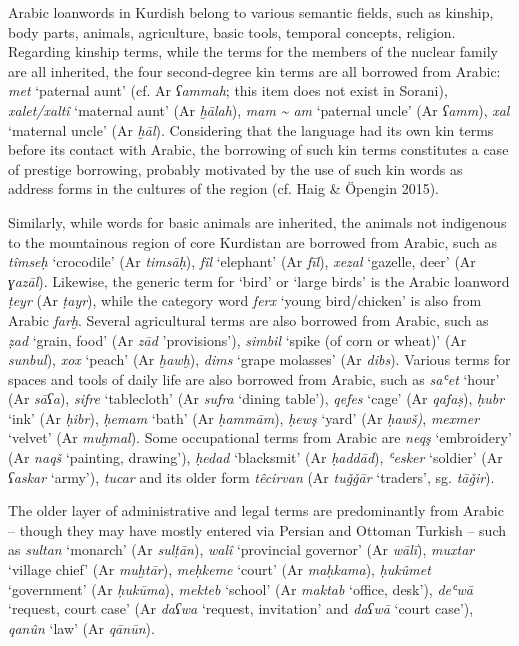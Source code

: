 \documentclass[output=paper]{langsci/langscibook}
\begin{document}
Arabic loanwords in Kurdish belong to various semantic fields, such as kinship, body parts, animals, agriculture, basic tools, temporal concepts, religion. Regarding kinship terms, while the terms for the members of the nuclear family are all inherited, the four second-degree kin terms are all borrowed from Arabic: \textit{met} ‘paternal aunt’ (cf. Ar \textit{ʕammah}; this item does not exist in Sorani), \textit{xalet/xaltî} ‘maternal aunt’ (Ar \textit{ḫālah}), \textit{mam} \textit{{\textasciitilde} am} ‘paternal uncle’ (Ar \textit{ʕamm}), \textit{xal} ‘maternal uncle’ (Ar \textit{ḫāl}). Considering that the language had its own kin terms before its contact with Arabic, the borrowing of such kin terms constitutes a case of prestige borrowing, probably motivated by the use of such kin words as address forms in the cultures of the region (cf. Haig \& Öpengin 2015).

Similarly, while words for basic animals are inherited, the animals not indigenous to the mountainous region of core Kurdistan are borrowed from Arabic, such as \textit{tîmseḥ} ‘crocodile’ (Ar \textit{timsāḥ}), \textit{fîl} ‘elephant’ (Ar \textit{fīl}), \textit{xezal} ‘gazelle, deer’ (Ar \textit{ɣazāl}). Likewise, the generic term for ‘bird’ or ‘large birds’ is the Arabic loanword \textit{ṭeyr} (Ar \textit{ṭayr}), while the category word \textit{ferx} ‘young bird/chicken’ is also from Arabic \textit{farḫ}. Several agricultural terms are also borrowed from Arabic, such as \textit{ẓad} ‘grain, food’ (Ar \textit{zād} 'provisions'), \textit{simbil} ‘spike (of corn or wheat)’ (Ar \textit{sunbul}), \textit{xox} ‘peach’ (Ar \textit{ḫawḫ}), \textit{dims} ‘grape molasses’ (Ar \textit{dibs}). Various terms for spaces and tools of daily life are also borrowed from Arabic, such as \textit{saʿet} ‘hour’ (Ar \textit{sāʕa}), \textit{sifre} ‘tablecloth’ (Ar \textit{sufra} ‘dining table’), \textit{qefes} ‘cage’ (Ar \textit{qafaṣ}), \textit{ḥubr} ‘ink’ (Ar \textit{ḥibr}), \textit{ḥemam} ‘bath’ (Ar \textit{ḥammām}), \textit{ḥewş} ‘yard’ (Ar \textit{ḥawš)}, \textit{mexmer} ‘velvet’ (Ar \textit{muḫmal}). Some occupational terms from Arabic are \textit{neqş} ‘embroidery’ (Ar \textit{naqš} ‘painting, drawing’), \textit{ḥedad} ‘blacksmit’ (Ar \textit{ḥaddād}), \textit{ʿesker} ‘soldier’ (Ar \textit{ʕaskar} ‘army’), \textit{tucar} and its older form \textit{têcirvan} (Ar \textit{tuǧǧār} ‘traders’, sg. \textit{tāǧir}).  

The older layer of administrative and legal terms are predominantly from Arabic – though they may have mostly entered via Persian and Ottoman Turkish – such as \textit{sultan} ‘monarch’ (Ar \textit{sulṭān}), \textit{walî} ‘provincial governor’ (Ar \textit{wālī}), \textit{muxtar} ‘village chief’ (Ar \textit{muḫtār}), \textit{meḥkeme} ‘court’ (Ar \textit{maḥkama}), \textit{ḥukûmet} ‘government’ (Ar \textit{ḥukūma}), \textit{mekteb} ‘school’ (Ar \textit{maktab} ‘office, desk’), \textit{deʿwā} ‘request, court case’ (Ar \textit{daʕwa} ‘request, invitation’ and \textit{daʕwā} ‘court case’), \textit{qanûn} ‘law’ (Ar \textit{qānūn}).  
\end{document}
